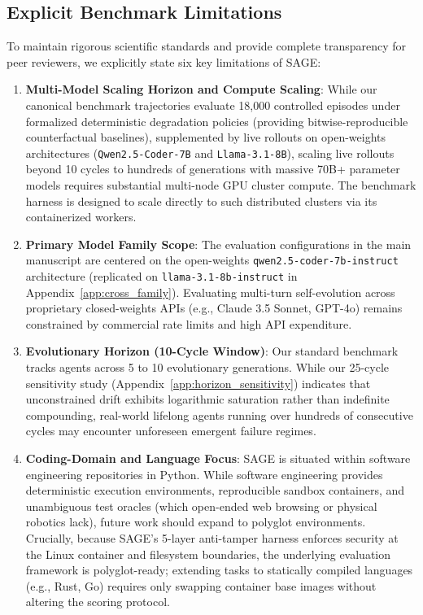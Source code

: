 \documentclass{article}
\begin{document}
\subsection{Explicit Benchmark Limitations}
To maintain rigorous scientific standards and provide complete transparency for peer reviewers, we explicitly state six key limitations of SAGE:
\begin{enumerate}
    \item \textbf{Multi-Model Scaling Horizon and Compute Scaling}: While our canonical benchmark trajectories evaluate 18,000 controlled episodes under formalized deterministic degradation policies (providing bitwise-reproducible counterfactual baselines), supplemented by live rollouts on open-weights architectures (\texttt{Qwen2.5-Coder-7B} and \texttt{Llama-3.1-8B}), scaling live rollouts beyond 10 cycles to hundreds of generations with massive 70B+ parameter models requires substantial multi-node GPU cluster compute. The benchmark harness is designed to scale directly to such distributed clusters via its containerized workers.
    \item \textbf{Primary Model Family Scope}: The evaluation configurations in the main manuscript are centered on the open-weights \texttt{qwen2.5-coder-7b-instruct} architecture (replicated on \texttt{llama-3.1-8b-instruct} in Appendix~\ref{app:cross_family}). Evaluating multi-turn self-evolution across proprietary closed-weights APIs (e.g., Claude 3.5 Sonnet, GPT-4o) remains constrained by commercial rate limits and high API expenditure.
    \item \textbf{Evolutionary Horizon (10-Cycle Window)}: Our standard benchmark tracks agents across 5 to 10 evolutionary generations. While our 25-cycle sensitivity study (Appendix~\ref{app:horizon_sensitivity}) indicates that unconstrained drift exhibits logarithmic saturation rather than indefinite compounding, real-world lifelong agents running over hundreds of consecutive cycles may encounter unforeseen emergent failure regimes.
    \item \textbf{Coding-Domain and Language Focus}: SAGE is situated within software engineering repositories in Python. While software engineering provides deterministic execution environments, reproducible sandbox containers, and unambiguous test oracles (which open-ended web browsing or physical robotics lack), future work should expand to polyglot environments. Crucially, because SAGE's 5-layer anti-tamper harness enforces security at the Linux container and filesystem boundaries, the underlying evaluation framework is polyglot-ready; extending tasks to statically compiled languages (e.g., Rust, Go) requires only swapping container base images without altering the scoring protocol.

\end{enumerate}
\end{document}
